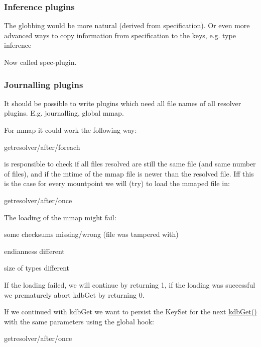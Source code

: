\subsubsection*{Inference plugins}

The globbing would be more natural (derived from specification). Or even more advanced ways to copy information from specification to the keys, e.\+g. type inference

Now called {\ttfamily spec}-\/plugin.

\subsubsection*{Journalling plugins}

It should be possible to write plugins which need all file names of all resolver plugins. E.\+g. journalling, global mmap.

For mmap it could work the following way\+: \begin{DoxyVerb}    getresolver/after/foreach
\end{DoxyVerb}


is responsible to check if all files resolved are still the same file (and same number of files), and if the {\ttfamily mtime} of the mmap file is newer than the resolved file. Iff this is the case for every mountpoint we will (try) to load the mmaped file in\+: \begin{DoxyVerb}    getresolver/after/once
\end{DoxyVerb}


The loading of the mmap might fail\+:


\begin{DoxyItemize}
\item some checksums missing/wrong (file was tampered with)
\item endianness different
\item size of types different
\end{DoxyItemize}

If the loading failed, we will continue by returning 1, if the loading was successful we prematurely abort {\ttfamily kdb\+Get} by returning 0.

If we continued with {\ttfamily kdb\+Get} we want to persist the Key\+Set for the next {\ttfamily \hyperlink{group__kdb_ga28e385fd9cb7ccfe0b2f1ed2f62453a1}{kdb\+Get()}} with the same parameters using the global hook\+: \begin{DoxyVerb}    getresolver/after/once
\end{DoxyVerb}


